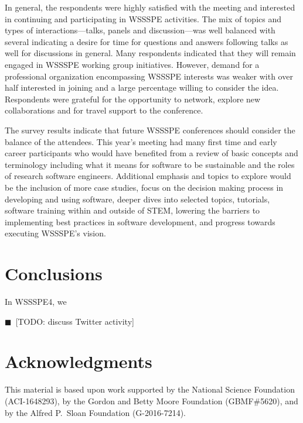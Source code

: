 \documentclass[11pt, oneside]{amsart}
\newcommand{\todo}[1]{{\color{blue}$\blacksquare$~\textsf{[TODO: #1]}}}
\begin{document}
In general, the respondents were highly satisfied with the meeting and interested in continuing and participating in WSSSPE activities.
The mix of topics and types of interactions---talks, panels and discussion---was well balanced with several indicating a desire for time for questions and answers following talks as well for discussions in general.
Many respondents indicated that they will remain engaged in WSSSPE working group initiatives.
However, demand for a professional organization encompassing WSSSPE interests was weaker with over half interested in joining and a large percentage willing to consider the idea.
Respondents were grateful for the opportunity to network, explore new collaborations and for travel support to the conference.

The survey results indicate that future WSSSPE conferences should consider the balance of the attendees.
This year's meeting had many first time and early career participants who would have benefited from a review of basic concepts and terminology including what it means for software to be sustainable and the roles of research software engineers.
Additional emphasis and topics to explore would be the inclusion of more case studies, focus on the decision making process in developing and using software, deeper dives into selected topics, tutorials, software training within and outside of STEM, lowering the barriers to implementing best practices in software development, and progress towards executing WSSSPE's vision.

\section{Conclusions} \label{sec:conclusions}

In WSSSPE4, we

\todo{discuss Twitter activity}


\section*{Acknowledgments} \label{sec:acks}

This material is based upon work supported by the National Science Foundation (ACI-1648293),
by the Gordon and Betty Moore Foundation (GBMF\#5620),
and by the Alfred P.~Sloan Foundation (G-2016-7214).
\end{document}
